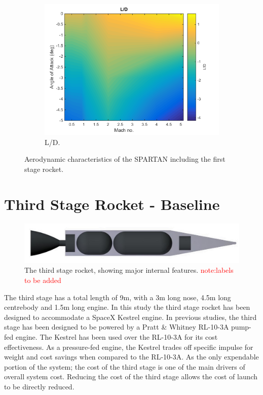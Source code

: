 \begin{figure}
\begin{subfigure}{.5\textwidth}
		\includegraphics[width=0.99\linewidth]{figures/3_vehicle_design/FirstStageLD}
		\caption{L/D.}
		\label{fig:LD-EFirstStage}
	\end{subfigure}
	\caption{Aerodynamic characteristics of the SPARTAN including the first stage rocket.}
	\label{fig:FirstStageAero}
\end{figure}


	

	\section{Third Stage Rocket - Baseline}\label{sec:ThirdStageBaseline}
	
	\begin{figure}
\centering
\includegraphics[width=0.7\linewidth]{figures/3_vehicle_design/3rdStage}
\caption{The third stage rocket, showing major internal features. \textcolor{red}{note:labels to be added}}
\label{fig:3rdStage}
\end{figure}
	
	
	The third stage has a total length of 9m, with a 3m long nose, 4.5m long centrebody and 1.5m long engine.
	In this study the third stage rocket has been designed to accommodate a SpaceX Kestrel engine. In previous studies, the third stage has been designed to be powered by a Pratt \& Whitney RL-10-3A pump-fed engine. The Kestrel has been used over the RL-10-3A for its cost effectiveness. As a pressure-fed engine, the Kestrel trades off specific impulse for weight and cost savings when compared to the RL-10-3A. As the only expendable portion of the system; the cost of the third stage is one of the main drivers of overall system cost. Reducing the cost of the third stage allows the cost of launch to be directly reduced. 
	
